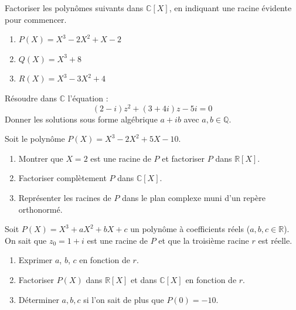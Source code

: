 \documentclass[11pt]{article}
\newcounter{popsec}
\newcounter{popsub}
\newcommand{\courssub}[1]{%
  \stepcounter{popsub}%
  \par\vspace{9pt}\noindent{\popxbold\fontsize{11.5}{13}\selectfont\color{popink}{\color{poporange}\thepopsec.\thepopsub}\hspace{6pt}#1}\par\nopagebreak\vspace{4pt}
}
\begin{document}
\begin{exercice}
Factoriser les polynômes suivants dans $\mathbb{C}[X]$, en indiquant une racine évidente pour commencer.
\begin{enumerate}
\item $P(X) = X^3 - 2X^2 + X - 2$
\item $Q(X) = X^3 + 8$
\item $R(X) = X^3 - 3X^2 + 4$
\end{enumerate}
\end{exercice}

\courssub{Je m'entraîne}

\begin{exercice}
Résoudre dans $\mathbb{C}$ l'équation :
\[ (2-i)z^2 + (3+4i)z - 5i = 0 \]
Donner les solutions sous forme algébrique $a+ib$ avec $a,b \in \mathbb{Q}$.
\end{exercice}

\begin{exercice}
Soit le polynôme $P(X) = X^3 - 2X^2 + 5X - 10$.
\begin{enumerate}
\item Montrer que $X=2$ est une racine de $P$ et factoriser $P$ dans $\mathbb{R}[X]$.
\item Factoriser complètement $P$ dans $\mathbb{C}[X]$.
\item Représenter les racines de $P$ dans le plan complexe muni d'un repère orthonormé.
\end{enumerate}
\end{exercice}

\begin{exercice}
Soit $P(X) = X^3 + aX^2 + bX + c$ un polynôme à coefficients réels ($a,b,c \in \mathbb{R}$).
On sait que $z_0 = 1+i$ est une racine de $P$ et que la troisième racine $r$ est réelle.
\begin{enumerate}
\item Exprimer $a$, $b$, $c$ en fonction de $r$.
\item Factoriser $P(X)$ dans $\mathbb{R}[X]$ et dans $\mathbb{C}[X]$ en fonction de $r$.
\item Déterminer $a,b,c$ si l'on sait de plus que $P(0) = -10$.
\end{enumerate}
\end{exercice}
\end{document}
